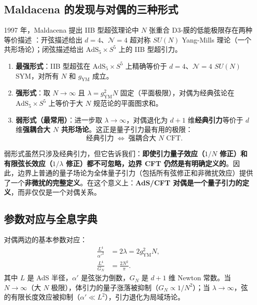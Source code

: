 \subsection{Maldacena 的发现与对偶的三种形式}

1997 年，Maldacena 提出 IIB 型超弦理论中 $N$ 张重合 D3-膜的低能极限存在两种等价描述 \cite{Maldacena1997}：开弦描述给出 $d=4$、$\mathcal{N}=4$ 超对称 $SU(N)$ Yang-Mills 理论（一个共形场论）；闭弦描述给出 $\mathrm{AdS}_5 \times S^5$ 上的 IIB 型超引力。

\begin{theorem}
    \begin{enumerate}
        \item \textbf{最强形式}：IIB 型超弦在 $\mathrm{AdS}_5 \times S^5$ 上精确等价于 $d=4$、$\mathcal{N}=4$ $SU(N)$ SYM，对所有 $N$ 和 $g_{\text{YM}}$ 成立。
        \item \textbf{强形式}：取 $N \to \infty$ 且 $\lambda = g_{\text{YM}}^2 N$ 固定（平面极限），对偶为经典弦论在 $\mathrm{AdS}_5 \times S^5$ 上等价于大 $N$ 规范论的平面图求和。
        \item \textbf{弱形式（最常用）}：进一步取 $\lambda \to \infty$，对偶退化为 $d+1$ 维\textbf{经典引力}等价于 $d$ 维\textbf{强耦合大 $N$ 共形场论}。这正是量子引力最有用的极限：
        \begin{equation}
            \boxed{\text{经典引力} \;\Longleftrightarrow\; \text{强耦合大 $N$ CFT}}.
        \end{equation}
    \end{enumerate}
\end{theorem}

\begin{remark}[为什么这对量子引力重要]
    弱形式虽然只涉及经典引力，但它告诉我们：\textbf{即使引力量子效应（$1/N$ 修正）和有限弦长效应（$1/\lambda$ 修正）都不可忽略，边界 CFT 仍然是有明确定义的}。因此，边界上普通的量子场论为全体量子引力（包括所有弦修正和非微扰效应）提供了一个\textbf{非微扰的完整定义}。在这个意义上：\textbf{AdS/CFT 对偶是一个量子引力的定义}，而非仅仅是一个对偶关系。
\end{remark}

\subsection{参数对应与全息字典}

对偶两边的基本参数对应：
\begin{align}
    \frac{L^4}{\alpha'^2} &= 2\lambda = 2g_{\text{YM}}^2 N, \\
    \frac{L^4}{G_N} &= \frac{2N^2}{\pi}.
\end{align}
其中 $L$ 是 AdS 半径，$\alpha'$ 是弦张力倒数，$G_N$ 是 $d+1$ 维 Newton 常数。当 $N \to \infty$（大 $N$ 极限），体引力的量子涨落被抑制（$G_N \propto 1/N^2$）；当 $\lambda \to \infty$，弦的有限长度效应被抑制（$\alpha' \ll L^2$），引力退化为局域场论。

